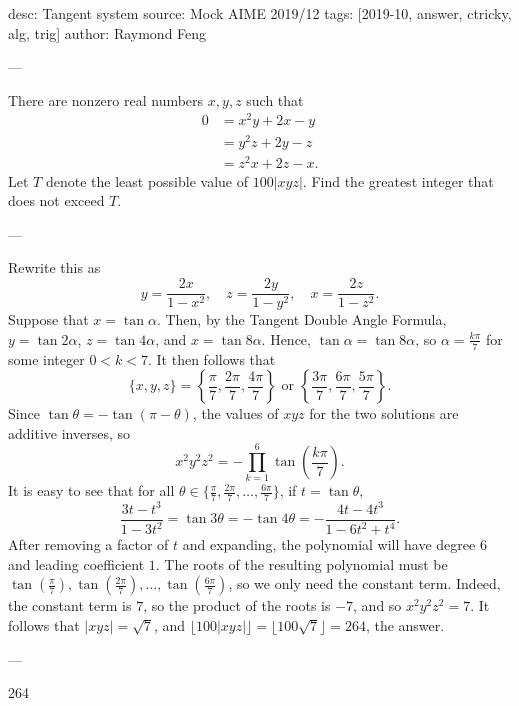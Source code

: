 desc: Tangent system
source: Mock AIME 2019/12
tags: [2019-10, answer, ctricky, alg, trig]
author: Raymond Feng

---

There are nonzero real numbers $x,y,z$ such that
\begin{align*}
    0&=x^2y+2x-y\\ &=y^2z+2y-z\\ &=z^2x+2z-x.
\end{align*}
Let $T$ denote the least possible value of $100|xyz|$. Find the greatest integer that does not exceed $T$.

---

Rewrite this as \[y=\frac{2x}{1-x^2},\quad z=\frac{2y}{1-y^2},\quad x=\frac{2z}{1-z^2}.\]
Suppose that $x=\tan\alpha$. Then, by the Tangent Double Angle Formula, $y=\tan 2\alpha$, $z=\tan 4\alpha$, and $x=\tan 8\alpha$. Hence, $\tan\alpha=\tan 8\alpha$, so $\alpha=\tfrac{k\pi}7$ for some integer $0<k<7$. It then follows that \[\{x,y,z\}=\left\{\frac{\pi}7,\frac{2\pi}7,\frac{4\pi}7\right\}\text{ or }\left\{\frac{3\pi}7,\frac{6\pi}7,\frac{5\pi}7\right\}.\]
Since $\tan\theta=-\tan(\pi-\theta)$, the values of $xyz$ for the two solutions are additive inverses, so \[x^2y^2z^2=-\prod_{k=1}^6\tan\left(\frac{k\pi}7\right).\]
It is easy to see that for all $\theta\in\{\tfrac{\pi}7,\tfrac{2\pi}7,\ldots,\tfrac{6\pi}7\}$, if $t=\tan\theta$, \[\frac{3t-t^3}{1-3t^2}=\tan 3\theta=-\tan 4\theta=-\frac{4t-4t^3}{1-6t^2+t^4}.\]
After removing a factor of $t$ and expanding, the polynomial will have degree $6$ and leading coefficient $1$. The roots of the resulting polynomial must be $\tan(\frac{\pi}7),\tan(\frac{2\pi}7),\ldots,\tan(\frac{6\pi}7)$, so we only need the constant term. Indeed, the constant term is $7$, so the product of the roots is $-7$, and so $x^2y^2z^2=7$. It follows that $|xyz|=\sqrt7$, and $\big\lfloor 100|xyz|\big\rfloor=\big\lfloor 100\sqrt7\big\rfloor=264$, the answer.

---

264
